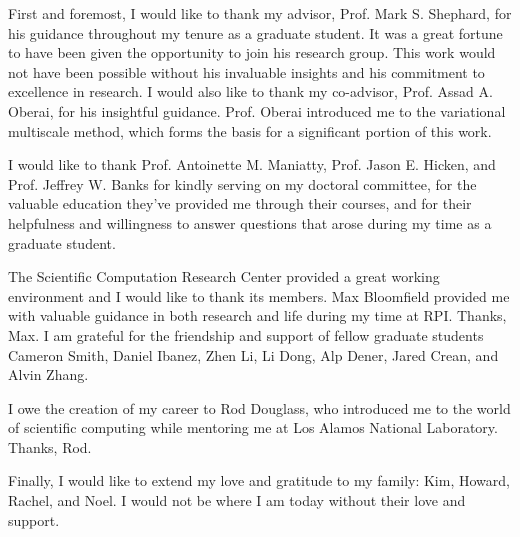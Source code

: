 
First and foremost, I would like to thank my advisor,
Prof. Mark S. Shephard, for his guidance throughout my tenure
as a graduate student. It was a great fortune to have been
given the opportunity to join his research group. This
work would not have been possible without his invaluable
insights and his commitment to excellence in research.
I would also like to thank my co-advisor, Prof. Assad A.
Oberai, for his insightful guidance. Prof. Oberai introduced
me to the variational multiscale method, which forms the
basis for a significant portion of this work.

I would like to thank Prof. Antoinette M. Maniatty,
Prof. Jason E. Hicken, and Prof. Jeffrey W. Banks for
kindly serving on my doctoral committee, for the valuable
education they've provided me through their courses,
and for their helpfulness and willingness to answer questions
that arose during my time as a graduate student.

The Scientific Computation Research Center provided a
great working environment and I would like to thank its
members. Max Bloomfield provided me with valuable guidance
in both research and life during my time at RPI. Thanks, Max.
I am grateful for the friendship and support of fellow
graduate students Cameron Smith, Daniel Ibanez, Zhen Li,
Li Dong, Alp Dener, Jared Crean, and Alvin Zhang.

I owe the creation of my career to Rod Douglass, who
introduced me to the world of scientific computing while
mentoring me at Los Alamos National Laboratory.
Thanks, Rod.

Finally, I would like to extend my love and gratitude
to my family: Kim, Howard, Rachel, and Noel. I would not
be where I am today without their love and support.
